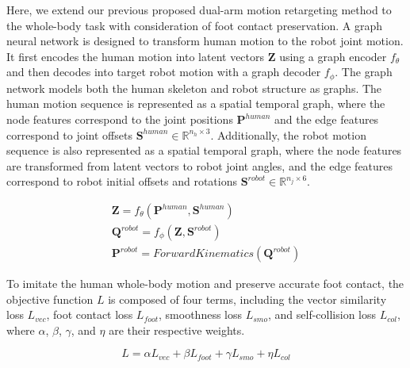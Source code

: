 \documentclass[a4paper, 10pt, conference]{ieeeconf}      %
\begin{document}
Here, we extend our previous proposed dual-arm motion retargeting method \cite{c10} to the whole-body task with consideration of foot contact preservation. 
A graph neural network is designed to transform human motion to the robot joint motion. It first encodes the human motion into latent vectors $\boldsymbol{Z}$ using a graph encoder $f_\theta$ and then decodes into target robot motion with a graph decoder $f_\phi$. The graph network models both the human skeleton and robot structure as graphs. The human motion sequence is represented as a spatial temporal graph, where the node features correspond to the joint positions $\boldsymbol{P}^{human}$ and the edge features correspond to joint offsets $\boldsymbol{S}^{human} \in \mathbb{R}^{n_h \times 3}$. Additionally, the robot motion sequence is also represented as a spatial temporal graph, where the node features are transformed from latent vectors to robot joint angles, and the edge features correspond to robot initial offsets and rotations  $\boldsymbol{S}^{robot} \in \mathbb{R}^{n_j \times 6}$.

\begin{gather}
    \boldsymbol{Z} = f_\theta (\boldsymbol{P}^{human}, \boldsymbol{S}^{human})\\
    \boldsymbol{Q}^{robot} = f_\phi (\boldsymbol{Z}, \boldsymbol{S}^{robot})\\
    \boldsymbol{P}^{robot} = ForwardKinematics(\boldsymbol{Q}^{robot})
\end{gather}

To imitate the human whole-body motion and preserve accurate foot contact, the objective function $L$ is composed of four terms, including the vector similarity loss $L_{vec}$, foot contact loss $L_{foot}$, smoothness loss $L_{smo}$, and self-collision loss $L_{col}$, where $\alpha$, $\beta$, $\gamma$, and $\eta$ are their respective weights.

\begin{equation}
\label{Eq:retarget}
    L = \alpha L_{vec} + \beta L_{foot} + \gamma L_{smo} + \eta L_{col}
\end{equation}
\end{document}
